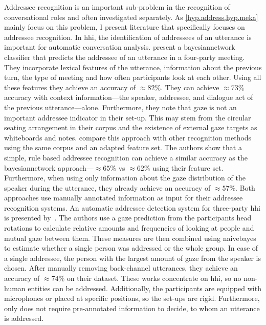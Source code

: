 Addressee recognition is an important sub-problem in the recognition of \glspl{conversational role} and often investigated  separately.
As \cref{hyp.address,hyp.meka} mainly focus on this problem, I present literature that specifically focuses on \gls{addressee} recognition.
In \gls{hhi}, the identification of \glspl{addressee} of an utterance is important for automatic \gls{conversation} analysis.
 present a \gls{bayesiannetwork} classifier that predicts the \gls{addressee} of an utterance in a four-party meeting.
They incorporate lexical features of the utterance, information about the previous \gls{turn}, the type of meeting and how often participants look at each other.
Using all these features they achieve an \gls{accuracy} of \(\approx 82\%\).
They can achieve \(\approx 73\%\) \gls{accuracy} with context information---the \gls{speaker}, \gls{addressee}, and dialogue act of the previous utterance---alone.
Furthermore, they note that gaze is not an important \gls{addressee} indicator in their set-up.
This may stem from the circular seating arrangement in their corpus and the existence of external gaze targets as whiteboards and notes.
 compare this approach with other recognition methods using the same corpus and an adapted feature set.
The authors show that a simple, rule based \gls{addressee} recognition can achieve a similar \gls{accuracy} as the \gls{bayesiannetwork} approach---\(\approx 65\%\) vs \(\approx 62\%\) using their feature set.
Furthermore, when using only information about the gaze distribution of the \gls{speaker} during the utterance, they already achieve an \gls{accuracy} of \(\approx 57\%\).
Both approaches use manually annotated information as input for their \gls{addressee} recognition systems.
An automatic \gls{addressee} detection system for three-party \gls{hhi} is presented by~.
The authors use a gaze prediction from the participants head rotations to calculate relative amounts and frequencies of looking at people and mutual gaze between them.
These measures are then combined using \gls{naivebayes} to estimate whether a single person was addressed or the whole group.
In case of a single \gls{addressee}, the person with the largest amount of gaze from the \gls{speaker} is chosen. 
After manually removing back-channel utterances, they achieve an \gls{accuracy} of \(\approx 74\%\) on their dataset. 
These works concentrate on \gls{hhi}, so no non-human entities can be addressed.
Additionally, the participants are equipped with microphones or placed at specific positions, so the set-ups are rigid.
Furthermore, only  does not require pre-annotated information to decide, to whom an utterance is addressed.

